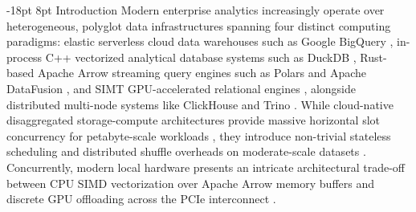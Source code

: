 \documentclass[10pt,a4paper]{article}
\makeatletter
\renewcommand\section{\@startsection{section}{1}{\z@}%
  {-18pt \@plus -4pt \@minus -2pt}%
  {8pt \@plus 2pt}%
  {\normalfont\large\bfseries}}
\makeatother
\begin{document}
\section{Introduction}
Modern enterprise analytics increasingly operate over heterogeneous, polyglot data infrastructures spanning four distinct computing paradigms: elastic serverless cloud data warehouses such as Google BigQuery \cite{melnik2010dremel, melnik2020dremel, lounissi2025funda}, in-process C++ vectorized analytical database systems such as DuckDB \cite{raasveldt2019duckdb, kuiper2024duckdb_ooc}, Rust-based Apache Arrow streaming query engines such as Polars and Apache DataFusion \cite{lamb2024datafusion}, and SIMT GPU-accelerated relational engines \cite{chrysogelos2019hetexchange, shanbhag2020crystal, bress2013hype}, alongside distributed multi-node systems like ClickHouse \cite{schulze2024clickhouse} and Trino \cite{sethi2019presto}. While cloud-native disaggregated storage-compute architectures provide massive horizontal slot concurrency for petabyte-scale workloads \cite{shojaee2024serverless, abdalla2022bigdata}, they introduce non-trivial stateless scheduling and distributed shuffle overheads on moderate-scale datasets \cite{begoli2018calcite, garcia2008database, lounissi2025funda}. Concurrently, modern local hardware presents an intricate architectural trade-off between CPU SIMD vectorization over Apache Arrow memory buffers and discrete GPU offloading across the PCIe interconnect \cite{milicevic2024dlquery, root2019mapd, kim2022blazingsql}.
\end{document}
